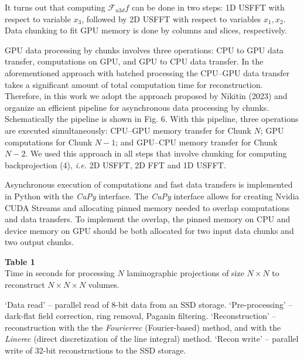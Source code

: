 \documentclass{article}
\begin{document}
It turns out that computing $\mathcal{F}_{u3d}f$ can be done in two steps: 1D USFFT with respect to variable $x_3$, followed by 2D USFFT with respect to variables $x_1, x_2$. Data chunking to fit GPU memory is done by columns and slices, respectively.

GPU data processing by chunks involves three operations: CPU to GPU data transfer, computations on GPU, and GPU to CPU data transfer. In the aforementioned approach with batched processing the CPU–GPU data transfer takes a significant amount of total computation time for reconstruction. Therefore, in this work we adopt the approach proposed by Nikitin (2023) and organize an efficient pipeline for asynchronous data processing by chunks. Schematically the pipeline is shown in Fig. 6. With this pipeline, three operations are executed simultaneously: CPU–GPU memory transfer for Chunk $N$; GPU computations for Chunk $N - 1$; and GPU–CPU memory transfer for Chunk $N - 2$. We used this approach in all steps that involve chunking for computing backprojection (4), \emph{i.e.} 2D USFFT, 2D FFT and 1D USFFT.

Asynchronous execution of computations and fast data transfers is implemented in Python with the \emph{CuPy} interface. The \emph{CuPy} interface allows for creating Nvidia CUDA Streams and allocating pinned memory needed to overlap computations and data transfers. To implement the overlap, the pinned memory on CPU and device memory on GPU should be both allocated for two input data chunks and two output chunks.

\noindent\textbf{Table 1}\\
Time in seconds for processing $N$ laminographic projections of size $N \times N$ to reconstruct $N \times N \times N$ volumes.

‘Data read’ – parallel read of 8-bit data from an SSD storage. ‘Pre-processing’ – dark-flat field correction, ring removal, Paganin filtering. ‘Reconstruction’ – reconstruction with the the \emph{Fourierrec} (Fourier-based) method, and with the \emph{Linerec} (direct discretization of the line integral) method. ‘Recon write’ – parallel write of 32-bit reconstructions to the SSD storage.
\end{document}
